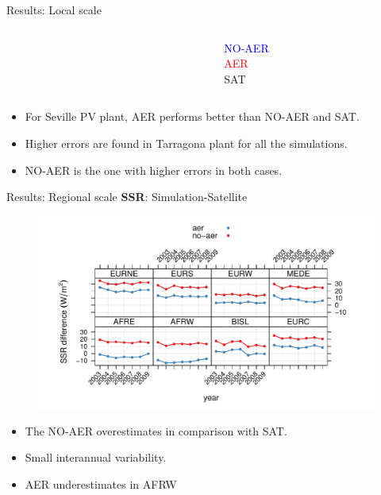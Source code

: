 \documentclass{beamer}%
\begin{document}
\begin{frame}[fragile]{Results: Local scale}
\begin{columns}
\begin{column}{0.8\textwidth}
\begin{figure}
  \end{figure}
\end{column}
\begin{column}{0.2\textwidth}
  \tiny{{\textcolor{blue}{NO-AER}}}\\
  \tiny{{\textcolor{red}{AER}}}\\
  \tiny{{\textcolor{green!90}{SAT}}}\\
\end{column}
\end{columns}
{\small{\begin{itemize}
\item For Seville PV plant, AER performs better than NO-AER and SAT.
\item Higher errors are found in Tarragona plant for all the simulations. 
\item NO-AER is the one with higher errors in both cases.
\end{itemize}}}  
\end{frame}

\begin{frame}[fragile]{Results: Regional scale}
\textbf{SSR}: Simulation-Satellite  
  \begin{figure}
  \includegraphics[scale=0.5]{dif_model_sat_zonas}%
\end{figure}
\begin{itemize}
\item The NO-AER overestimates in comparison with SAT.
\item Small interannual variability.
\item AER underestimates in AFRW  
\end{itemize}
\end{frame}
\end{document}

